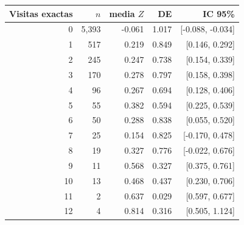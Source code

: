 \begin{tabular}{rrrrr}
\toprule
Visitas exactas & $n$ & media $Z$ & DE & IC 95\% \\
\midrule
0 & 5,393 & -0.061 & 1.017 & [-0.088, -0.034] \\
1 & 517 & 0.219 & 0.849 & [0.146, 0.292] \\
2 & 245 & 0.247 & 0.738 & [0.154, 0.339] \\
3 & 170 & 0.278 & 0.797 & [0.158, 0.398] \\
4 & 96 & 0.267 & 0.694 & [0.128, 0.406] \\
5 & 55 & 0.382 & 0.594 & [0.225, 0.539] \\
6 & 50 & 0.288 & 0.838 & [0.055, 0.520] \\
7 & 25 & 0.154 & 0.825 & [-0.170, 0.478] \\
8 & 19 & 0.327 & 0.776 & [-0.022, 0.676] \\
9 & 11 & 0.568 & 0.327 & [0.375, 0.761] \\
10 & 13 & 0.468 & 0.437 & [0.230, 0.706] \\
11 & 2 & 0.637 & 0.029 & [0.597, 0.677] \\
12 & 4 & 0.814 & 0.316 & [0.505, 1.124] \\
\bottomrule
\end{tabular}
